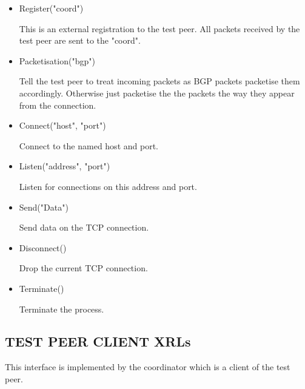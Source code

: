 \documentclass[11pt]{article}
\begin{document}
\begin{itemize}
\item Register("coord")
  
  This is an external registration to the test peer. All packets
  received by the test peer are sent to the "coord".

\item Packetisation("bgp")
  
  Tell the test peer to treat incoming packets as BGP packets
  packetise them accordingly. Otherwise just packetise the the packets
  the way they appear from the connection.
        
\item Connect("host", "port")

  Connect to the named host and port.

\item Listen("address", "port")

  Listen for connections on this address and port.

\item Send("Data")
  
  Send data on the TCP connection.        

\item Disconnect()

  Drop the current TCP connection.

\item Terminate()

  Terminate the process.

\end{itemize}

\subsection{TEST PEER CLIENT XRLs}

This interface is implemented by the coordinator which is a client of
the test peer.
\end{document}
